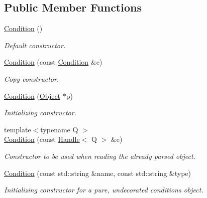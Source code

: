 \subsection*{Public Member Functions}
\begin{DoxyCompactItemize}
\item 
\hyperlink{class_d_d4hep_1_1_conditions_1_1_condition_a2dbcbbb3d3c0fef0cf843e7d41dd14c2}{Condition} ()
\begin{DoxyCompactList}\small\item\em Default constructor. \item\end{DoxyCompactList}\item 
\hyperlink{class_d_d4hep_1_1_conditions_1_1_condition_adda1381c6a8624074e5c6bb011c060ad}{Condition} (const \hyperlink{class_d_d4hep_1_1_conditions_1_1_condition}{Condition} \&c)
\begin{DoxyCompactList}\small\item\em Copy constructor. \item\end{DoxyCompactList}\item 
\hyperlink{class_d_d4hep_1_1_conditions_1_1_condition_a6bd06500c7a9dce845e676d6370ad3c3}{Condition} (\hyperlink{class_d_d4hep_1_1_conditions_1_1_interna_1_1_condition_object}{Object} $\ast$p)
\begin{DoxyCompactList}\small\item\em Initializing constructor. \item\end{DoxyCompactList}\item 
{\footnotesize template$<$typename Q $>$ }\\\hyperlink{class_d_d4hep_1_1_conditions_1_1_condition_a54aa97a5c9e69787c94f1aee79d2f919}{Condition} (const \hyperlink{class_d_d4hep_1_1_handle}{Handle}$<$ Q $>$ \&e)
\begin{DoxyCompactList}\small\item\em Constructor to be used when reading the already parsed object. \item\end{DoxyCompactList}\item 
\hyperlink{class_d_d4hep_1_1_conditions_1_1_condition_a0169d2e5f3d98ac7500b9f612ad21cc9}{Condition} (const std::string \&name, const std::string \&type)
\begin{DoxyCompactList}\small\item\em Initializing constructor for a pure, undecorated conditions object. \item\end{DoxyCompactList}\item 

\end{DoxyCompactItemize}
